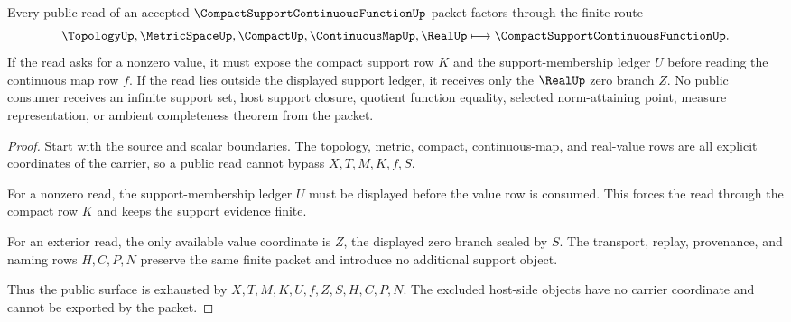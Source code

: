 \begin{theorem}
\label{thm:compact-support-continuous-function-finite-support-exhaustion}
Every public read of an accepted $\CompactSupportContinuousFunctionUp$ packet factors through the finite route
$$
\TopologyUp,\MetricSpaceUp,\CompactUp,\ContinuousMapUp,\RealUp
\longmapsto
\CompactSupportContinuousFunctionUp .
$$
If the read asks for a nonzero value, it must expose the compact support row $K$ and the support-membership ledger $U$ before reading the continuous map row $f$. If the read lies outside the displayed support ledger, it receives only the $\RealUp$ zero branch $Z$. No public consumer receives an infinite support set, host support closure, quotient function equality, selected norm-attaining point, measure representation, or ambient completeness theorem from the packet.
\end{theorem}
\begin{proof}
Start with the source and scalar boundaries. The topology, metric, compact, continuous-map, and real-value rows are all explicit coordinates of the carrier, so a public read cannot bypass $X,T,M,K,f,S$.

For a nonzero read, the support-membership ledger $U$ must be displayed before the value row is consumed. This forces the read through the compact row $K$ and keeps the support evidence finite.

For an exterior read, the only available value coordinate is $Z$, the displayed zero branch sealed by $S$. The transport, replay, provenance, and naming rows $H,C,P,N$ preserve the same finite packet and introduce no additional support object.

Thus the public surface is exhausted by $X,T,M,K,U,f,Z,S,H,C,P,N$. The excluded host-side objects have no carrier coordinate and cannot be exported by the packet.
\end{proof}



